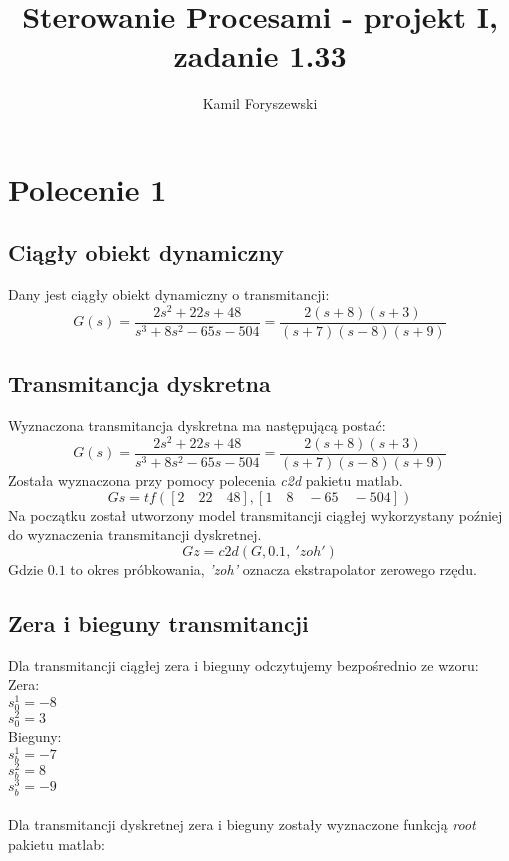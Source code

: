 \documentclass[a4paper, 11pt]{article}
\author{Kamil Foryszewski}
\title{Sterowanie Procesami - projekt I, zadanie 1.33}
\begin{document}

\maketitle
\tableofcontents

\section{Polecenie 1}

\subsection{Ciągły obiekt dynamiczny}
Dany jest ciągły obiekt dynamiczny o transmitancji: 
$$G(s) = \frac{2s^2+22s+48}{s^3+8s^2-65s-504} = \frac{2(s+8)(s+3)}{(s+7)(s-8)(s+9)}$$

\subsection{Transmitancja dyskretna}
Wyznaczona transmitancja dyskretna ma następującą postać: 
$$G(s) = \frac{2s^2+22s+48}{s^3+8s^2-65s-504} = \frac{2(s+8)(s+3)}{(s+7)(s-8)(s+9)}$$
Została wyznaczona przy pomocy polecenia \emph{c2d} pakietu matlab. 
$$Gs = tf([2\quad 22\quad 48], [1\quad 8\quad -65\quad -504])$$
Na początku został utworzony model transmitancji ciągłej wykorzystany poźniej do wyznaczenia transmitancji dyskretnej. 
$$Gz = c2d(G,0.1,\ 'zoh')$$
Gdzie $0.1$ to okres próbkowania, \emph{'zoh'} oznacza ekstrapolator zerowego rzędu. 
\subsection{Zera i bieguny transmitancji}
Dla transmitancji ciągłej zera i bieguny odczytujemy bezpośrednio ze wzoru:\\
Zera: \\
$s_0^1 = -8$\\
$s_0^2 = 3$\\
Bieguny: \\
$s_b^1 = -7$\\
$s_b^2 = 8$\\
$s_b^3 = -9$\\
\\
Dla transmitancji dyskretnej zera i bieguny zostały wyznaczone funkcją \emph{root} pakietu matlab: 
\end{document}
